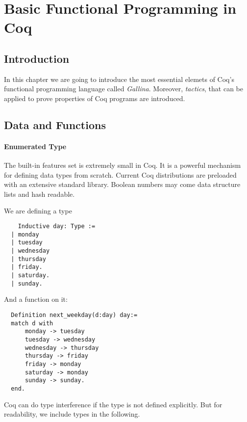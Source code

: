 \section{Basic Functional Programming in Coq}




\subsection{Introduction}

In this chapter we are going to introduce the most essential elemets of Coq's functional programming language called {\itshape  Gallina}. 
Moreover, {\itshape tactics}, that can be applied to prove properties of Coq programs are introduced.


\subsection{Data and Functions}

 \paragraph{Enumerated Type}
 
  The built-in features set is extremely small in Coq. It is a powerful mechanism for defining data types from scratch.
  Current Coq distributions are preloaded with an extensive standard library.
  Boolean numbers may come data structure lists and hash readable. 
  
  \begin{example}
  We are defining a type 
  \begin{lstlisting}
    Inductive day: Type :=
  | monday
  | tuesday
  | wednesday
  | thursday
  | friday.
  | saturday.
  | sunday.
  \end{lstlisting} 
  And a function on it: 
  \begin{lstlisting}
  Definition next_weekday(d:day) day:=
  match d with 
	  monday -> tuesday
	  tuesday -> wednesday
	  wednesday -> thursday
	  thursday -> friday
	  friday -> monday
	  saturday -> monday
	  sunday -> sunday.
  end.  
  \end{lstlisting}
  \end{example}

  Coq can do type interference if the type is not defined explicitly.
  But for readability, we include types in the following.
   
